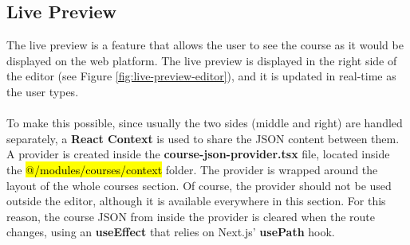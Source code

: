 \subsection{Live Preview}

\noindent The live preview is a feature that allows the user to see the course as it would be displayed on the web platform. The live preview is displayed in the right side of the editor (see Figure \ref{fig:live-preview-editor}), and it is updated in real-time as the user types.
\\\\
\noindent To make this possible, since usually the two sides (middle and right) are handled separately, a \textbf{React Context} is used to share the JSON content between them. A provider is created inside the \textbf{course-json-provider.tsx} file, located inside the \hl{@/modules/courses/context} folder. The provider is wrapped around the layout of the whole courses section. Of course, the provider should not be used outside the editor, although it is available everywhere in this section. For this reason, the course JSON from inside the provider is cleared when the route changes, using an \textbf{useEffect} that relies on Next.js' \textbf{usePath} hook.

